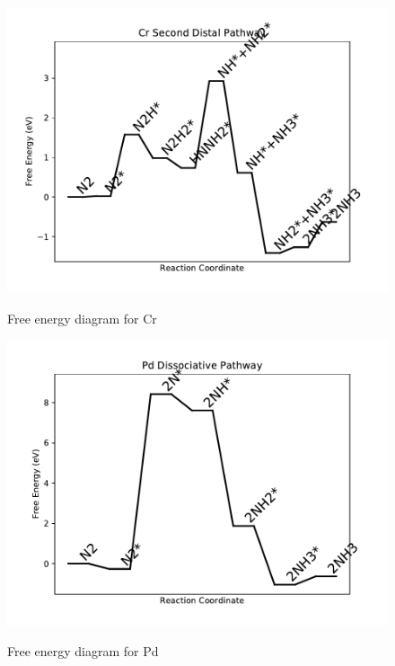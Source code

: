 \documentclass[journal=jacsat,manuscript=article]{achemso}
\begin{document}
\begin{figure}
\includegraphics[width=1\linewidth]{data/plots/Cr_distal_2.pdf}
\label{fig:Cr_distal_2}
\caption{Free energy diagram for Cr}
\end{figure}

\newpage
\begin{figure}
\includegraphics[width=1\linewidth]{data/plots/Pd_dissociative.pdf}
\label{fig:Pd_dissociative}
\caption{Free energy diagram for Pd}
\end{figure}
\end{document}
